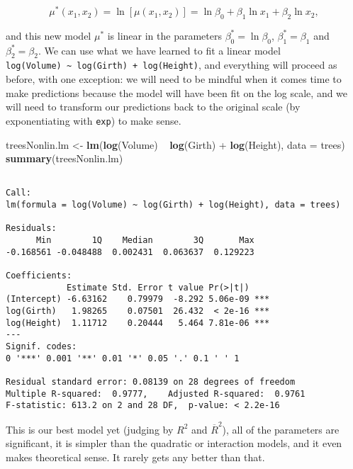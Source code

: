 \documentclass[]{book}
\newenvironment{Shaded}{\begin{snugshade}}{\end{snugshade}}
\newcommand{\KeywordTok}[1]{\textcolor[rgb]{0.13,0.29,0.53}{\textbf{{#1}}}}
\newcommand{\DataTypeTok}[1]{\textcolor[rgb]{0.13,0.29,0.53}{{#1}}}
\newcommand{\StringTok}[1]{\textcolor[rgb]{0.31,0.60,0.02}{{#1}}}
\newcommand{\NormalTok}[1]{{#1}}
\numberwithin{equation}{chapter}
\numberwithin{figure}{chapter}
\theoremstyle{plain}
\theoremstyle{definition}
\theoremstyle{remark}
\theoremstyle{definition}
\theoremstyle{definition}
\theoremstyle{remark}
\begin{document}
\begin{equation}
\mu^{\ast}(x_{1},x_{2})=\ln\left[\mu(x_{1},x_{2})\right]=\ln\beta_{0}+\beta_{1}\ln x_{1}+\beta_{2}\ln x_{2},
\end{equation}

and this new model \(\mu^{\ast}\) is linear in the parameters
\(\beta_{0}^{\ast}=\ln\beta_{0}\), \(\beta_{1}^{\ast}=\beta_{1}\) and
\(\beta_{2}^{\ast}=\beta_{2}\). We can use what we have learned to fit a
linear model
\texttt{log(Volume)\ \textasciitilde{}\ log(Girth)\ +\ log(Height)}, and
everything will proceed as before, with one exception: we will need to
be mindful when it comes time to make predictions because the model will
have been fit on the log scale, and we will need to transform our
predictions back to the original scale (by exponentiating with
\texttt{exp}) to make sense.

\begin{Shaded}
\begin{Highlighting}[]
\NormalTok{treesNonlin.lm <-}\StringTok{ }\KeywordTok{lm}\NormalTok{(}\KeywordTok{log}\NormalTok{(Volume) ~}\StringTok{ }\KeywordTok{log}\NormalTok{(Girth) +}\StringTok{ }\KeywordTok{log}\NormalTok{(Height), }\DataTypeTok{data =} \NormalTok{trees)}
\KeywordTok{summary}\NormalTok{(treesNonlin.lm)}
\end{Highlighting}
\end{Shaded}

\begin{verbatim}

Call:
lm(formula = log(Volume) ~ log(Girth) + log(Height), data = trees)

Residuals:
      Min        1Q    Median        3Q       Max 
-0.168561 -0.048488  0.002431  0.063637  0.129223 

Coefficients:
            Estimate Std. Error t value Pr(>|t|)    
(Intercept) -6.63162    0.79979  -8.292 5.06e-09 ***
log(Girth)   1.98265    0.07501  26.432  < 2e-16 ***
log(Height)  1.11712    0.20444   5.464 7.81e-06 ***
---
Signif. codes:  
0 '***' 0.001 '**' 0.01 '*' 0.05 '.' 0.1 ' ' 1

Residual standard error: 0.08139 on 28 degrees of freedom
Multiple R-squared:  0.9777,    Adjusted R-squared:  0.9761 
F-statistic: 613.2 on 2 and 28 DF,  p-value: < 2.2e-16
\end{verbatim}

This is our best model yet (judging by \(R^{2}\) and
\(\overline{R}^{2}\)), all of the parameters are significant, it is
simpler than the quadratic or interaction models, and it even makes
theoretical sense. It rarely gets any better than that.
\end{document}
